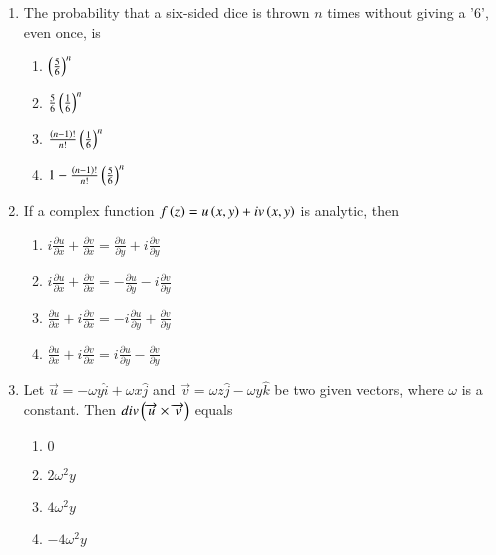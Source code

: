 \documentclass[journal,9pt,onecolumn]{IEEEtran}
\begin{document}
\begin{enumerate}
\item The probability that a six-sided dice is thrown $n$ times without giving a '6', even once, is
\begin{multicols}{4}    
\begin{enumerate}
    \item $\left( \frac{5}{6} \right)^n$
    \item $\frac{5}{6} \left( \frac{1}{6} \right)^n$
    \item $\frac{\left(n-1\right)!}{n!} \left( \frac{1}{6} \right)^n$
    \item $1 - \frac{\left(n-1\right)!}{n!} \left( \frac{5}{6} \right)^n$
\end{enumerate}
\end{multicols}


\item If a complex function $f\left(z\right) = u\left(x,y\right) + iv\left(x,y\right)$ is analytic, then

\begin{multicols}{4}
\begin{enumerate}
    \item $i \frac{\partial u}{\partial x} + \frac{\partial v}{\partial x} = \frac{\partial u}{\partial y} + i \frac{\partial v}{\partial y}$
    \item $i \frac{\partial u}{\partial x} + \frac{\partial v}{\partial x} = -\frac{\partial u}{\partial y} - i \frac{\partial v}{\partial y}$
    \item $ \frac{\partial u}{\partial x} + i\frac{\partial v}{\partial x} = -i\frac{\partial u}{\partial y} + \frac{\partial v}{\partial y}$
    \item $\frac{\partial u}{\partial x} + i \frac{\partial v}{\partial x} = i \frac{\partial u}{\partial y} - \frac{\partial v}{\partial y}$
\end{enumerate}
\end{multicols}

\item Let $\overrightarrow{u} = -\omega y\hat{i} + \omega x\hat{j}$ and $\overrightarrow{v} = \omega z\hat{j} - \omega y\hat{k}$ be two given vectors, where $\omega$ is a constant. Then $div\left(\overrightarrow{u} \times \overrightarrow{v}\right)$ equals

\begin{multicols}{4}
\begin{enumerate}
     \item $0$
    \item $2\omega^2 y$
    \item $4\omega^2 y$
    \item $-4\omega^2 y$
\end{enumerate}
\end{multicols}



\end{enumerate}
\end{document}
